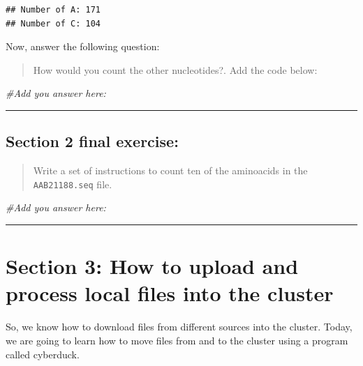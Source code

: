 \documentclass[
]{book}
\newenvironment{Shaded}{\begin{snugshade}}{\end{snugshade}}
\newcommand{\CommentTok}[1]{\textcolor[rgb]{0.56,0.35,0.01}{\textit{#1}}}
\begin{document}
\begin{verbatim}
## Number of A: 171
## Number of C: 104
\end{verbatim}

Now, answer the following question:

\begin{quote}
How would you count the other nucleotides?. Add the code below:
\end{quote}

\begin{Shaded}
\begin{Highlighting}[]
\CommentTok{\#Add you answer here:}

\end{Highlighting}
\end{Shaded}

\begin{center}\rule{0.5\linewidth}{0.5pt}\end{center}

\hypertarget{section-2-final-exercise}{%
\subsection{Section 2 final exercise:}\label{section-2-final-exercise}}

\begin{quote}
Write a set of instructions to count ten of the aminoacids in the \texttt{AAB21188.seq} file.
\end{quote}

\begin{Shaded}
\begin{Highlighting}[]
\CommentTok{\#Add you answer here:}

\end{Highlighting}
\end{Shaded}

\begin{center}\rule{0.5\linewidth}{0.5pt}\end{center}

\hypertarget{section-3-how-to-upload-and-process-local-files-into-the-cluster}{%
\section{Section 3: How to upload and process local files into the cluster}\label{section-3-how-to-upload-and-process-local-files-into-the-cluster}}

So, we know how to download files from different sources into the cluster. Today, we are going to learn how to move files from and to the cluster using a program called cyberduck.
\end{document}
